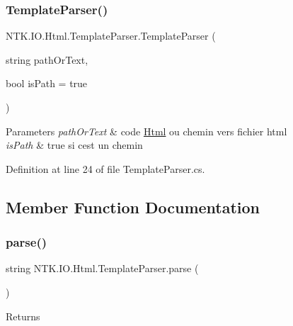 \subsubsection{\texorpdfstring{TemplateParser()}{TemplateParser()}}
{\footnotesize\ttfamily N\+T\+K.\+I\+O.\+Html.\+Template\+Parser.\+Template\+Parser (\begin{DoxyParamCaption}\item[{string}]{path\+Or\+Text,  }\item[{bool}]{is\+Path = {\ttfamily true} }\end{DoxyParamCaption})}






\begin{DoxyParams}{Parameters}
{\em path\+Or\+Text} & code \mbox{\hyperlink{namespace_n_t_k_1_1_i_o_1_1_html}{Html}} ou chemin vers fichier html\\
\hline
{\em is\+Path} & true si c\textquotesingle{}est un chemin\\
\hline
\end{DoxyParams}


Definition at line 24 of file Template\+Parser.\+cs.



\subsection{Member Function Documentation}
\mbox{\label{class_n_t_k_1_1_i_o_1_1_html_1_1_template_parser_ab7f5ba6329b8edc059afdac7f12c39c7}} 
\subsubsection{\texorpdfstring{parse()}{parse()}}
{\footnotesize\ttfamily string N\+T\+K.\+I\+O.\+Html.\+Template\+Parser.\+parse (\begin{DoxyParamCaption}{ }\end{DoxyParamCaption})}





\begin{DoxyReturn}{Returns}

\end{DoxyReturn}


